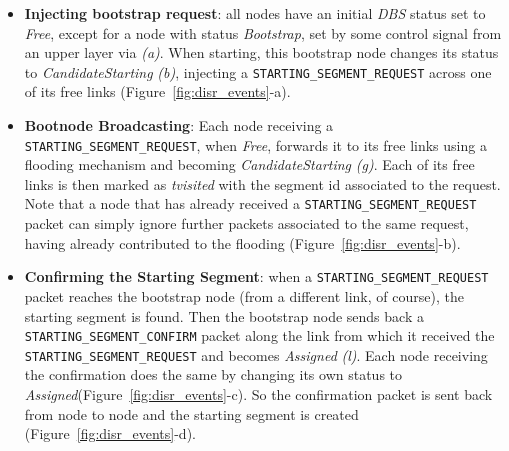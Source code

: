 \begin{itemize}
\item{\textbf{Injecting bootstrap request}}: all nodes have an initial
\emph{DBS} status set to \emph{Free}, except for a
 node with status \emph{Bootstrap}, set by some control signal from an
upper layer via \emph{(a)}. When starting, this bootstrap node 
changes its status to \emph{CandidateStarting} \emph{(b)}, injecting a
\texttt{STARTING\_SEGMENT\_REQUEST} across one of its free links
(Figure~\ref{fig:disr_events}-a). 

\item{\textbf{Bootnode Broadcasting}}: Each node receiving a \texttt{STARTING\_SEGMENT\_REQUEST},
when \emph{Free}, forwards it to its free links using a flooding mechanism and
becoming \emph{CandidateStarting} \emph{(g)}.
Each of its free links is then marked as \emph{tvisited} with the segment id
associated to the request. Note that a node that has already received a
\texttt{STARTING\_SEGMENT\_REQUEST} packet can simply ignore further packets
associated to the same request, having already contributed to the
flooding (Figure~\ref{fig:disr_events}-b).

\item{\textbf{Confirming the Starting Segment}}: when a \texttt{STARTING\_SEGMENT\_REQUEST} packet reaches
the bootstrap node (from a different link, of course), the starting
segment is found. Then the bootstrap node sends back a \texttt{STARTING\_SEGMENT\_CONFIRM}
packet along the link from which it received the
\texttt{STARTING\_SEGMENT\_REQUEST} and becomes \emph{Assigned} \emph{(l)}. Each
node receiving the confirmation does the same by changing its own status
to \emph{Assigned}(Figure~\ref{fig:disr_events}-c). So the confirmation packet is sent back from
node to node and the starting segment is created (Figure~\ref{fig:disr_events}-d). 





\end{itemize}
